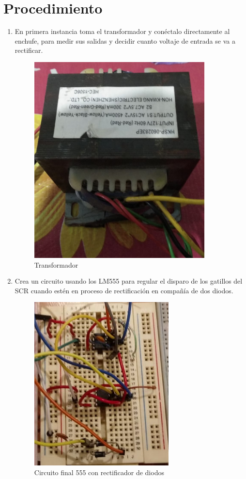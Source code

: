 \documentclass[letterpaper]{article}
\begin{document}
\section{Procedimiento}
\begin{enumerate}
    \item En primera instancia toma el transformador y conéctalo directamente al enchufe, para medir sus salidas y decidir cuanto voltaje de entrada se va a rectificar.
    \begin{figure}[htbp]
        \centering
        \includegraphics[scale=.5]{IMG/trans.PNG}
        \caption{Transformador}
        \label{fig:trans}
    \end{figure}
        
    
    \item Crea un circuito usando los LM555 para regular el disparo de los gatillos del SCR cuando estén en proceso de rectificación en compañía de dos diodos.
    \begin{figure}[htbp]
        \centering
        \includegraphics{IMG/555supergenial.PNG}
        \caption{Circuito final 555 con rectificador de diodos}
        \label{fig:lm5555555}
    \end{figure}
    

\end{enumerate}
\end{document}
